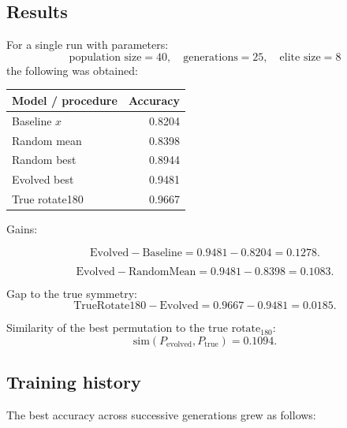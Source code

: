 \documentclass[11pt,a4paper]{report}
\begin{document}
\noindent{}


\subsection{Results}

For a single run with parameters:
\[
\text{population size}=40,\quad
\text{generations}=25,\quad
\text{elite size}=8
\]
the following was obtained:

\begin{center}
\begin{tabular}{lr}
\toprule
Model / procedure & Accuracy \\
\midrule
Baseline $x$ & 0.8204 \\
Random mean & 0.8398 \\
Random best & 0.8944 \\
Evolved best & 0.9481 \\
True rotate180 & 0.9667 \\
\bottomrule
\end{tabular}
\end{center}

Gains:

\[
\mathrm{Evolved}-\mathrm{Baseline}
=
0.9481-0.8204
=
0.1278.
\]

\[
\mathrm{Evolved}-\mathrm{RandomMean}
=
0.9481-0.8398
=
0.1083.
\]

Gap to the true symmetry:
\[
\mathrm{TrueRotate180}-\mathrm{Evolved}
=
0.9667-0.9481
=
0.0185.
\]

Similarity of the best permutation to the true $\mathrm{rotate}_{180}$:
\[
\mathrm{sim}(P_{\mathrm{evolved}},P_{\mathrm{true}})
=
0.1094.
\]

\subsection{Training history}

The best accuracy across successive generations grew as follows:
\end{document}
